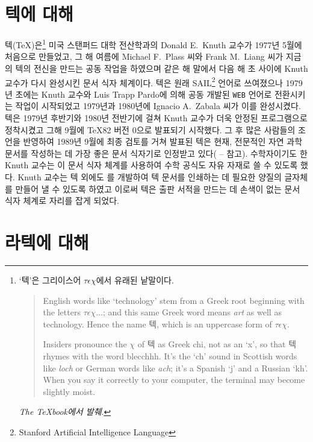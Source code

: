 \section{텍에 대해}

텍(\TeX)은\footnote{`텍'은 그리이스어
  $\tau\epsilon\chi{}$에서 유래된 낱말이다.
  \begin{quote}
    English words like `technology' stem from a Greek root beginning
    with the letters $\tau\epsilon\chi{}\ldots$; and this same Greek
    word means \textit{art} as well as technology. Hence the name
    텍, which is an uppercase form of $\tau\epsilon\chi{}$.

    Insiders pronounce the $\chi$ of 텍 as Greek chi, not as an
    `x', so that 텍 rhymes with the word blecchhh. It's the `ch'
    sound in Scottish words like \textit{loch} or German words like
    \textit{ach}; it's a Spanish `j' and a Russian `kh'. When you say
    it correctly to your computer, the terminal may become slightly
    moist.
  \end{quote}

  \hfill \textsl{The \TeX{}book에서 발췌}.} 미국 스탠퍼드 대학 전산학과의
Donald E.~Knuth 교수가 1977년 5월에 처음으로 만들었고, 그 해 여름에
Michael F.~Plass 씨와 Frank M.~Liang 씨가 지금의 텍의 전신을 만드는
공동 작업을 하였으며 같은 해 말에서 다음 해 초 사이에 Knuth 교수가
다시 완성시킨 문서 식자 체계이다. 텍은
원래 SAIL\footnote{Stanford Artificial Intelligence Language}
언어로 쓰여졌으나 1979년 초에는 Knuth 교수와 Luis Trapp
Pardo에 의해 공동 개발된 \texttt{WEB} 언어로 전환시키는 작업이 시작되었고
1979년과 1980년에 Ignacio A.~Zabala 씨가 이를 완성시켰다. 텍은
1979년 후반기와 1980년 전반기에 걸쳐 Knuth 교수가 더욱 안정된
프로그램으로 정착시켰고 그해 9월에 \TeX82 버전 0으로 발표되기
시작했다.  그 후 많은 사람들의 조언을 반영하여 1989년 9월에 최종
검토를 거쳐 발표된 텍은 현재, 전문적인 자연 과학 문서를 작성하는 데
가장 좋은 문서 식자기로 인정받고 있다(\cite{Knuth:1984:TB} --
\nocite{Knuth:ct-a} \nocite{Knuth:1986:TP} \nocite{Knuth:1986:MB} 
\cite{Knuth:1986:MP}\를 참고).  수학자이기도 한 Knuth 교수는 이 문서 식자 체계를
사용하여 수학 공식도 자유 자재로 쓸 수 있도록 했다.  Knuth 교수는
텍 외에도 \MF{}를 개발하여 텍 문서를 인쇄하는 데 필요한 양질의
글자체를 만들어 낼 수 있도록 하였고 이로써 텍은 출판 서적을 만드는 데
손색이 없는 문서 식자 체계로 자리를 잡게 되었다.


\section{라텍에 대해}

